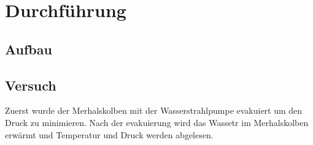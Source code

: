 \newpage
\section{Durchführung}
\label{sec:Durchfuehrung}
\subsection{Aufbau}
\subsection{Versuch}
Zuerst wurde der Merhalskolben mit der Wasserstrahlpumpe evakuiert um den Druck zu minimieren.
Nach der evakuierung wird das Wassetr im Merhalskolben erwärmt und Temperatur und Druck werden abgelesen.
